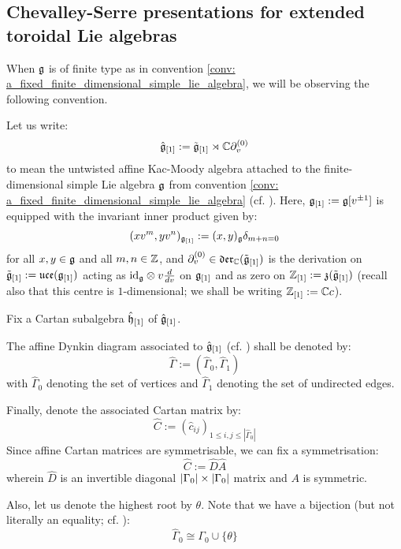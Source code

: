         \subsection{Chevalley-Serre presentations for extended toroidal Lie algebras}
            When $\mathfrak{g}$ is of finite type as in convention \ref{conv: a_fixed_finite_dimensional_simple_lie_algebra}, we will be observing the following convention.
            \begin{convention} \label{conv: a_fixed_untwisted_affine_kac_moody_algebra}
                Let us write:
                    $$\hat{\mathfrak{g}}_{[1]} := \tilde{\mathfrak{g}}_{[1]} \rtimes \mathbb{C} \partial_v^{(0)}$$
                to mean the untwisted affine Kac-Moody algebra attached to the finite-dimensional simple Lie algebra $\mathfrak{g}$ from convention \ref{conv: a_fixed_finite_dimensional_simple_lie_algebra} (cf. \cite[Chapter 7]{kac_infinite_dimensional_lie_algebras}). Here, $\mathfrak{g}_{[1]} := \mathfrak{g}[v^{\pm 1}]$ is equipped with the invariant inner product given by:
                    $$(x v^m, y v^n)_{\mathfrak{g}_{[1]}} := (x, y)_{\mathfrak{g}} \delta_{m + n = 0}$$
                for all $x, y \in \mathfrak{g}$ and all $m, n \in \mathbb{Z}$, and $\partial_v^{(0)} \in \mathfrak{der}_{\mathbb{C}}(\tilde{\mathfrak{g}}_{[1]})$ is the derivation on $\tilde{\mathfrak{g}}_{[1]} := \mathfrak{uce}(\mathfrak{g}_{[1]})$ acting as $\id_{\g} \tensor v \frac{d}{dv}$ on $\mathfrak{g}_{[1]}$ and as zero on $\mathbb{Z}_{[1]} := \mathfrak{z}(\tilde{\mathfrak{g}}_{[1]})$ (recall also that this centre is $1$-dimensional; we shall be writing $\mathbb{Z}_{[1]} := \mathbb{C} c$).
    
                Fix a Cartan subalgebra $\hat{\mathfrak{h}}_{[1]}$ of $\hat{\mathfrak{g}}_{[1]}$.
    
                The affine Dynkin diagram associated to $\hat{\mathfrak{g}}_{[1]}$ (cf. \cite[Chapter 4]{kac_infinite_dimensional_lie_algebras}) shall be denoted by:
                    $$\hat{\Gamma} := ( \hat{\Gamma}_0, \hat{\Gamma}_1 )$$
                with $\hat{\Gamma}_0$ denoting the set of vertices and $\hat{\Gamma}_1$ denoting the set of undirected edges.
    
                Finally, denote the associated Cartan matrix by:
                    $$\hat{C} := (\hat{c}_{ij})_{1 \leq i, j \leq |\hat{\Gamma}_0|}$$
                Since affine Cartan matrices are symmetrisable, we can fix a symmetrisation:
                    $$\hat{C} := \hat{D} \hat{A}$$
                wherein $\hat{D}$ is an invertible diagonal $|\Gamma_0| \x |\Gamma_0|$ matrix and $A$ is symmetric. 

                Also, let us denote the highest root by $\theta$. Note that we have a bijection (but not literally an equality; cf. \cite[Chapters 4, 5, 7]{kac_infinite_dimensional_lie_algebras}):
                    $$\hat{\Gamma}_0 \cong \Gamma_0 \cup \{\theta\}$$
            \end{convention}
